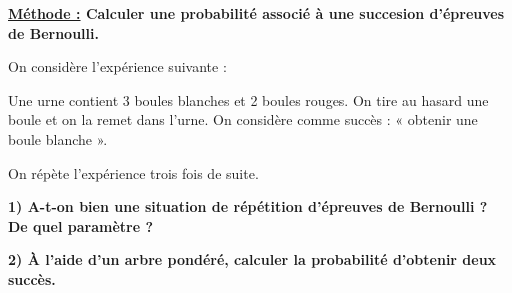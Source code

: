 \documentclass[12pt]{article}
\begin{document}
\vspace{5pt}
{\color{RedOrange}\textbf{\underline{Méthode :} Calculer une probabilité associé à une succesion d'épreuves 
de Bernoulli.}}

\vspace{5pt}
On considère l'expérience suivante :

\vspace{5pt}
Une urne contient 3 boules blanches et 2 boules rouges. On tire au hasard une boule et on la
remet dans l'urne. On considère comme succès : « obtenir une boule blanche ».

On répète l'expérience trois fois de suite.

\vspace{5pt}
\hspace{1cm}\textbf{1) A-t-on bien une situation de répétition d'épreuves de Bernoulli ? De quel paramètre ?}

\vspace{5pt}
\hspace{1cm}\textbf{2) À l’aide d’un arbre pondéré, calculer la probabilité d’obtenir deux succès.}

\vspace{0.5cm}
{\color{black!40}\dotfill}

\vspace{0.5cm}
{\color{black!40}\dotfill}

\vspace{0.5cm}
{\color{black!40}\dotfill}

\vspace{0.5cm}
{\color{black!40}\dotfill}

\vspace{0.5cm}
{\color{black!40}\dotfill}

\vspace{0.5cm}
{\color{black!40}\dotfill}

\vspace{0.5cm}
{\color{black!40}\dotfill}

\vspace{0.5cm}
{\color{black!40}\dotfill}

\vspace{0.5cm}
{\color{black!40}\dotfill}

\vspace{0.5cm}
{\color{black!40}\dotfill}

\vspace{20pt}
\end{document}
